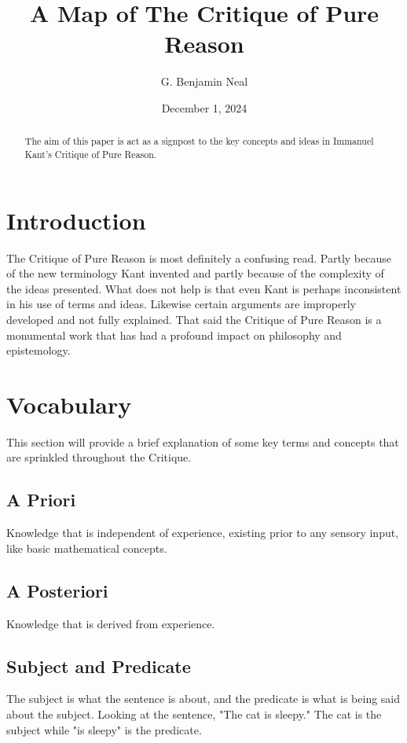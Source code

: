 \documentclass[a4paper]{article}
\begin{document}
\title{A Map of The Critique of Pure Reason}
\author{G. Benjamin Neal}
\date{December 1, 2024}
\maketitle

\begin{abstract}
The aim of this paper is act as a signpost to the key concepts and ideas in Immanuel Kant's Critique of Pure Reason.
\end{abstract}

\section{Introduction}
The Critique of Pure Reason is most definitely a confusing read. 
Partly because of the new terminology Kant invented and partly because of the complexity of the ideas presented.
What does not help is that even Kant is perhaps inconsistent in his use of terms and ideas.
Likewise certain arguments are improperly developed and not fully explained.
That said the Critique of Pure Reason is a monumental work that has had a profound impact on philosophy and epistemology.

\section{Vocabulary}
This section will provide a brief explanation of some key terms and concepts that are sprinkled throughout the Critique.

\subsection{A Priori}
Knowledge that is independent of experience, existing prior to any sensory input, like basic mathematical concepts.

\subsection{A Posteriori}
Knowledge that is derived from experience.

\subsection{Subject and Predicate}
The subject is what the sentence is about, and the predicate is what is being said about the subject.
Looking at the sentence, "The cat is sleepy."
The cat is the subject while "is sleepy" is the predicate.
\end{document}

